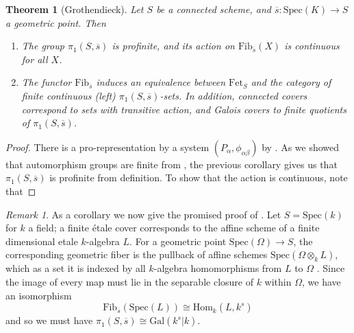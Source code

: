 \documentclass{article}
\newtheorem{theorem}{Theorem}[section]
\theoremstyle{definition}
\theoremstyle{remark}
\newtheorem*{remark}{Remark}
\theoremstyle{plain}
\begin{document}
\begin{theorem}[Grothendieck]
	Let $S$ be a connected scheme, and $\overline{s}: \text{Spec}(K) \to S$ a geometric point. Then \begin{enumerate} 
		\item The group $\pi_1(S, \overline{s})$ is profinite, and its action on $\text{Fib}_{\overline{s}}(X)$ is continuous for all $X$.
		\item The functor $\text{Fib}_{\overline{s}}$ induces an equivalence between $\text{Fet}_S$ and the category of finite continuous (left) $\pi_1(S, \overline{s})$-sets.	In addition, connected covers correspond to sets with transitive action, and Galois covers to finite quotients of $\pi_1(S, \overline{s})$.
 \end{enumerate} 
\end{theorem}

\begin{proof}
	There is a pro-representation by a system $(P_{\alpha}, \phi_{\alpha \beta})$  by .
	As we showed that automorphism groups are finite from , the previous corollary gives us that $\pi_1(S, \overline{s})$ is profinite from definition.
To show that the action is continuous, note that  
\end{proof}

\begin{remark}
As a corollary we now give the promised proof of .
Let $S = \text{Spec}(k)$ for $k$ a field; a finite \'etale cover corresponds to the affine scheme of a finite dimensional \;etale $k$-algebra $L$.
For a geometric point $\text{Spec}(\Omega) \to S$, the corresponding geometric fiber is the pullback of affine schemes $\text{Spec}(\Omega \otimes_k L)$, which as a set it is indexed by all $k$-algebra homomorphisms from $L$ to $\Omega$ .
Since the image of every map must lie in the separable closure of $k$ within $\Omega$, we have an isomorphism 
\[\text{Fib}_{\overline{s}}(\text{Spec}(L)) \cong \text{Hom}_k(L, k^s)\]
and so we must have $\pi_1(S, \overline{s}) \cong \text{Gal}(k^s|k)$.
\end{remark}
\end{document}
